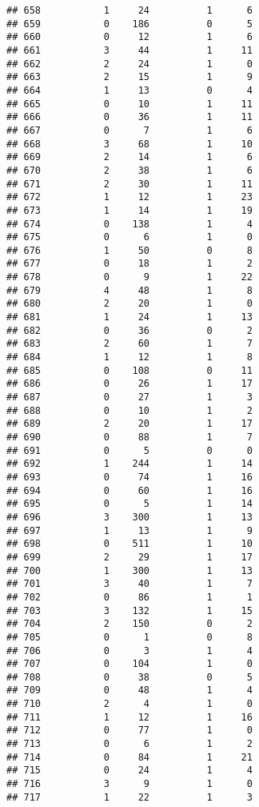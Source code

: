 \documentclass[]{article}
\begin{document}
\begin{verbatim}
## 658           1     24          1      6
## 659           0    186          0      5
## 660           0     12          1      6
## 661           3     44          1     11
## 662           2     24          1      0
## 663           2     15          1      9
## 664           1     13          0      4
## 665           0     10          1     11
## 666           0     36          1     11
## 667           0      7          1      6
## 668           3     68          1     10
## 669           2     14          1      6
## 670           2     38          1      6
## 671           2     30          1     11
## 672           1     12          1     23
## 673           1     14          1     19
## 674           0    138          1      4
## 675           0      6          1      0
## 676           1     50          0      8
## 677           0     18          1      2
## 678           0      9          1     22
## 679           4     48          1      8
## 680           2     20          1      0
## 681           1     24          1     13
## 682           0     36          0      2
## 683           2     60          1      7
## 684           1     12          1      8
## 685           0    108          0     11
## 686           0     26          1     17
## 687           0     27          1      3
## 688           0     10          1      2
## 689           2     20          1     17
## 690           0     88          1      7
## 691           0      5          0      0
## 692           1    244          1     14
## 693           0     74          1     16
## 694           0     60          1     16
## 695           0      5          1     14
## 696           3    300          1     13
## 697           1     13          1      9
## 698           0    511          1     10
## 699           2     29          1     17
## 700           1    300          1     13
## 701           3     40          1      7
## 702           0     86          1      1
## 703           3    132          1     15
## 704           2    150          0      2
## 705           0      1          0      8
## 706           0      3          1      4
## 707           0    104          1      0
## 708           0     38          0      5
## 709           0     48          1      4
## 710           2      4          1      0
## 711           1     12          1     16
## 712           0     77          1      0
## 713           0      6          1      2
## 714           0     84          1     21
## 715           0     24          1      4
## 716           3      9          1      0
## 717           1     22          1      3

\end{verbatim}
\end{document}
